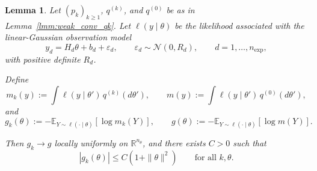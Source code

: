 \documentclass[a4paper,11pt]{article}
\newtheorem{lemma}{Lemma}
\begin{document}
\begin{lemma}\label{lmm:behavior_denom_eig_gauss}
Let $(p_k)_{k\ge1}$, $q^{(k)}$, and $q^{(0)}$ be as in Lemma~\ref{lmm:weak_conv_qk}.
Let \(\ell(y\mid\theta)\) be the likelihood associated with the linear-Gaussian observation model
\[
y_d = H_{d}\theta + b_{d} + \varepsilon_d,
\qquad
\varepsilon_d\sim\mathcal N(0,R_{d}),
\qquad d=1,\dots,n_{\mathrm{exp}},
\]
with positive definite \(R_{d}\).

Define
\[
m_k(y):=\int \ell(y\mid\theta')\,q^{(k)}(d\theta'),
\qquad
m(y):=\int \ell(y\mid\theta')\,q^{(0)}(d\theta'),
\]
and
\[
g_k(\theta):=
-\mathbb{E}_{Y\sim \ell(\cdot\mid\theta)}[\log m_k(Y)],
\qquad
g(\theta):=
-\mathbb{E}_{Y\sim \ell(\cdot\mid\theta)}[\log m(Y)].
\]

Then \(g_k\to g\) locally uniformly on \(\mathbb R^{n_\theta}\), and there exists \(C>0\) such that
\[
|g_k(\theta)|\le C(1+\|\theta\|^2)
\qquad\text{for all }k,\theta.
\]
\end{lemma}
\end{document}
